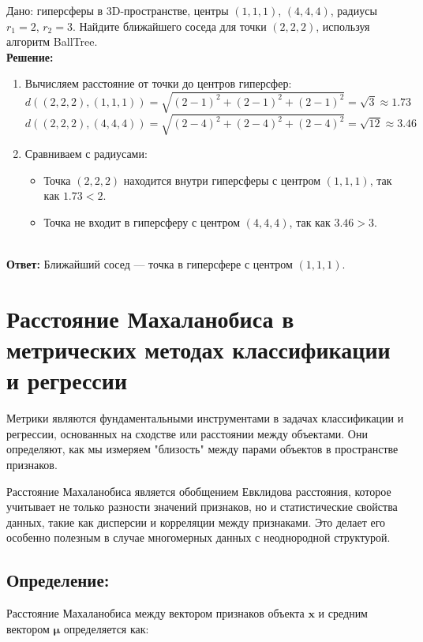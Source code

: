 Дано: гиперсферы в 3D-пространстве, центры \((1, 1, 1)\), \((4, 4, 4)\), радиусы \(r_1 = 2\), \(r_2 = 3\). Найдите ближайшего соседа для точки \((2, 2, 2)\), используя алгоритм BallTree.\\
\textbf{Решение:}
\begin{enumerate}
    \item Вычисляем расстояние от точки до центров гиперсфер:
    \[
    d((2, 2, 2), (1, 1, 1)) = \sqrt{(2-1)^2 + (2-1)^2 + (2-1)^2} = \sqrt{3} \approx 1.73
    \]
    \[
    d((2, 2, 2), (4, 4, 4)) = \sqrt{(2-4)^2 + (2-4)^2 + (2-4)^2} = \sqrt{12} \approx 3.46
    \]
    \item Сравниваем с радиусами:
    \begin{itemize}
        \item Точка \((2, 2, 2)\) находится внутри гиперсферы с центром \((1, 1, 1)\), так как \(1.73 < 2\).
        \item Точка не входит в гиперсферу с центром \((4, 4, 4)\), так как \(3.46 > 3\).
    \end{itemize}
\end{enumerate}\\
\textbf{Ответ:} Ближайший сосед — точка в гиперсфере с центром \((1, 1, 1)\).

\section{Расстояние Махаланобиса в метрических методах классификации и регрессии}

Метрики являются фундаментальными инструментами в задачах классификации и регрессии, основанных на сходстве или расстоянии между объектами. Они определяют, как мы измеряем "близость" между парами объектов в пространстве признаков.

Расстояние Махаланобиса является обобщением Евклидова расстояния, которое учитывает не только разности значений признаков, но и статистические свойства данных, такие как дисперсии и корреляции между признаками. Это делает его особенно полезным в случае многомерных данных с неоднородной структурой.

\subsection{Определение:}

Расстояние Махаланобиса между вектором признаков объекта \( \mathbf{x} \) и средним вектором \( \mathbf{\mu} \) определяется как:

